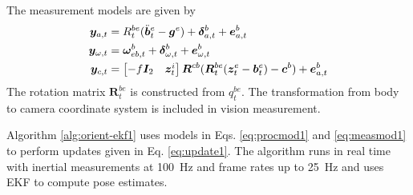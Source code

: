 The measurement models are given by
\begin{subequations} \label{eq:measmod1} \begin{align}
	\bm{y}_{a,t} &= R_{t}^{be} ( \ddot{\bm{b}}_{t}^{e} - \bm{g}^{e} ) + \bm{\delta}_{a,t}^{b} + \bm{e}_{a,t}^{b} \label{subeq:accel}\\
	\bm{y}_{\omega,t} &= \bm{\omega}_{eb,t}^{b} + \bm{\delta}_{\omega,t}^{b} + \bm{e}_{\omega,t}^{b} \label{subeq:gyro}\\
	\bm{y}_{c,t} &= \begin{bmatrix} -f\bm{I}_{2} & \bm{z}_{t}^{i} \end{bmatrix} \bm{R}^{cb} ( \bm{R}_{t}^{be} ( \bm{z}_{t}^{e} - \bm{b}_{t}^{e} ) - \bm{c}^{b} )  + \bm{e}_{a,t}^{b} \label{subeq:cam}
\end{align} \end{subequations}
The rotation matrix $ \bm{R}_{t}^{be} $ is constructed from $ q_{t}^{be} $. The transformation from body to camera coordinate system is included in vision measurement.

Algorithm \ref{alg:orient-ekf1} uses models in Eqs. \ref{eq:procmod1} and \ref{eq:measmod1} to perform updates given in Eq. \ref{eq:update1}. The algorithm runs in real time with inertial measurements at \SI{100}{Hz} and frame rates up to \SI{25}{Hz} and uses EKF to compute pose estimates. 


